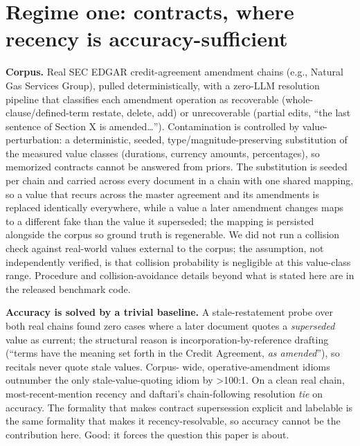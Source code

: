 \documentclass[11pt]{article}
\begin{document}
\section{Regime one: contracts, where recency is accuracy-sufficient}
\label{sec:contracts}

\textbf{Corpus.} Real SEC EDGAR credit-agreement amendment chains (e.g., Natural Gas Services
Group), pulled deterministically, with a zero-LLM resolution pipeline that classifies each
amendment operation as recoverable (whole-clause/defined-term restate, delete, add) or
unrecoverable (partial edits, ``the last sentence of Section X is amended\ldots''). Contamination
is controlled by value-perturbation: a deterministic, seeded, type/magnitude-preserving
substitution of the measured value classes (durations, currency amounts, percentages), so
memorized contracts cannot be answered from priors. The substitution is seeded per chain and
carried across every document in a chain with one shared mapping, so a value that recurs
across the master agreement and its amendments is replaced identically everywhere, while a
value a later amendment changes maps to a different fake than the value it superseded; the
mapping is persisted alongside the corpus so ground truth is regenerable. We did not run a
collision check against real-world values external to the corpus; the assumption, not
independently verified, is that collision probability is negligible at this value-class
range. Procedure and collision-avoidance details beyond what is stated here are in the
released benchmark code.

\textbf{Accuracy is solved by a trivial baseline.} A stale-restatement probe over both real
chains found zero cases where a later document quotes a \emph{superseded} value as current;
the structural reason is incorporation-by-reference drafting (``terms have the meaning set
forth in the Credit Agreement, \emph{as amended}''), so recitals never quote stale values. Corpus-
wide, operative-amendment idioms outnumber the only stale-value-quoting idiom by \textgreater100:1.
On a clean real chain, most-recent-mention recency and daftari's chain-following resolution
\emph{tie} on accuracy. The formality that makes contract supersession explicit and labelable
is the same formality that makes it recency-resolvable, so accuracy cannot be the
contribution here. Good: it forces the question this paper is about.
\end{document}
